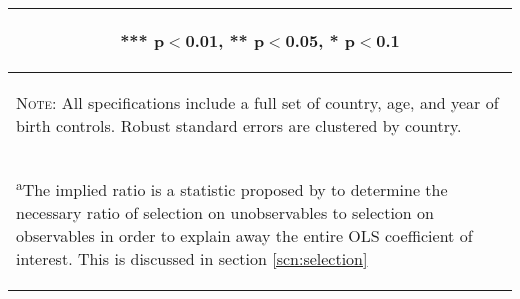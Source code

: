 \documentclass{article}[11pt,subeqn]
\begin{document}
\begin{spacing}{1.25}
\begin{table}[!htbp]
\begin{center}
\begin{tabular}{lccccc}
\multicolumn{6}{c}{\begin{footnotesize} *** p$<$0.01, ** p$<$0.05, * p$<$0.1\end{footnotesize}} \\
\bottomrule 
\multicolumn{6}{p{12.5cm}}{\setstretch{0.9}\begin{footnotesize}\textsc{Note:} All specifications include a full set of country, age, and year of birth controls. Robust standard errors are clustered by country.\end{footnotesize}}\\
\multicolumn{6}{p{12.5cm}}{\setstretch{0.9}\begin{footnotesize}\textsuperscript{a}The implied ratio is a statistic proposed by \citet{Altonjietal2005} to determine the necessary ratio of selection on unobservables to selection on observables in order to explain away the entire OLS coefficient of interest.  This is discussed in section \ref{scn:selection}  \end{footnotesize}}\\
\end{tabular}
\end{center}
\end{table}



\end{spacing}
\end{document}
